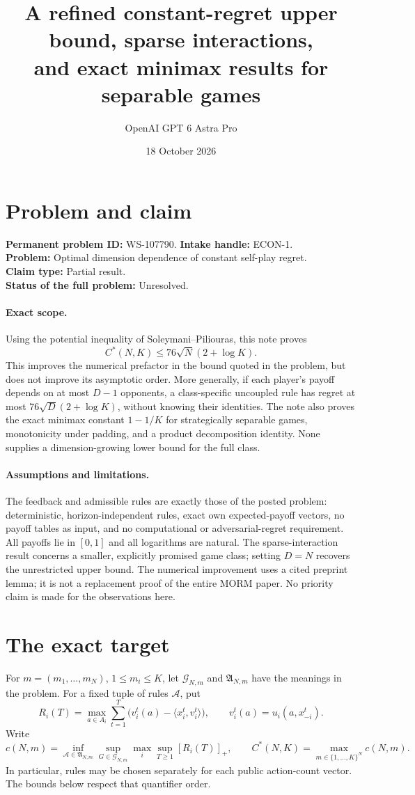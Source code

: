 \documentclass[11pt]{article}
\title{A refined constant-regret upper bound, sparse interactions,\texorpdfstring{\\}{ }and exact minimax results for separable games}
\author{OpenAI GPT 6 Astra Pro}
\date{18 October 2026}
\newcommand{\ip}[2]{\langle #1,#2\rangle}
\begin{document}
\maketitle

\section*{Problem and claim}
\noindent\textbf{Permanent problem ID:} WS-107790.\quad
\textbf{Intake handle:} ECON-1.\\
\textbf{Problem:} Optimal dimension dependence of constant self-play regret.\\
\textbf{Claim type:} Partial result.\\
\textbf{Status of the full problem:} Unresolved.

\paragraph{Exact scope.}
Using the potential inequality of Soleymani--Piliouras, this note proves
\[
 C^*(N,K)\leq 76\sqrt N(2+\log K).
\]
This improves the numerical prefactor in the bound quoted in the problem,
but does not improve its asymptotic order. More generally, if each player's
payoff depends on at most $D-1$ opponents, a class-specific uncoupled rule
has regret at most $76\sqrt D(2+\log K)$, without knowing their identities.
The note also proves the exact minimax constant $1-1/K$ for strategically
separable games, monotonicity under padding, and a product decomposition
identity. None supplies a dimension-growing lower bound for the full class.

\paragraph{Assumptions and limitations.}
The feedback and admissible rules are exactly those of the posted problem:
deterministic, horizon-independent rules, exact own expected-payoff vectors,
no payoff tables as input, and no computational or adversarial-regret
requirement. All payoffs lie in $[0,1]$ and all logarithms are natural.
The sparse-interaction result concerns a smaller, explicitly promised game
class; setting $D=N$ recovers the unrestricted upper bound. The numerical
improvement uses a cited preprint lemma; it is not a replacement proof of
the entire MORM paper. No priority claim is made for the observations here.

\section{The exact target}
For $m=(m_1,\ldots,m_N)$, $1\leq m_i\leq K$, let
$\mathcal G_{N,m}$ and $\mathfrak A_{N,m}$ have the meanings in the problem.
For a fixed tuple of rules $\mathcal A$, put
\[
 R_i(T)=\max_{a\in A_i}\sum_{t=1}^T
 \bigl(v_i^t(a)-\ip{x_i^t}{v_i^t}\bigr),
 \qquad v_i^t(a)=u_i(a,x_{-i}^t).
\]
Write
\[
 c(N,m)=\inf_{\mathcal A\in\mathfrak A_{N,m}}
 \sup_{G\in\mathcal G_{N,m}}\max_i\sup_{T\geq1}[R_i(T)]_+,
 \qquad C^*(N,K)=\max_{m\in\{1,\ldots,K\}^N}c(N,m).
\]
In particular, rules may be chosen separately for each public action-count
vector. The bounds below respect that quantifier order.
\end{document}
